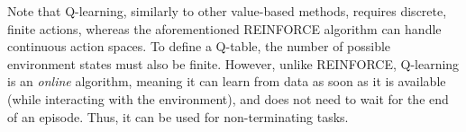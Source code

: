 Note that Q-learning, similarly to other value-based methods, requires discrete, finite actions, whereas the aforementioned REINFORCE algorithm can handle continuous action spaces. To define a Q-table, the number of possible environment states must also be finite. However, unlike REINFORCE, Q-learning is an \textit{online} algorithm, meaning it can learn from data as soon as it is available (while interacting with the environment), and does not need to wait for the end of an episode. Thus, it can be used for non-terminating tasks.